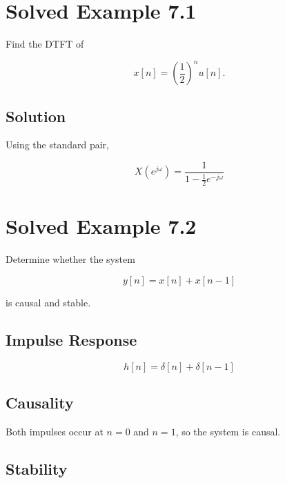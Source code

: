 
\section{Solved Example 7.1}

Find the DTFT of

\[
x[n]=\left(\frac12\right)^n u[n].
\]


\subsection{Solution}

Using the standard pair,

\[
\boxed{
X(e^{j\omega})=
\frac{1}{1-\frac12 e^{-j\omega}}
}
\]


\section{Solved Example 7.2}

Determine whether the system

\[
y[n]=x[n]+x[n-1]
\]

is causal and stable.


\subsection{Impulse Response}

\[
h[n]=\delta[n]+\delta[n-1]
\]


\subsection{Causality}

Both impulses occur at \(n=0\) and \(n=1\), so the system is causal.


\subsection{Stability}

